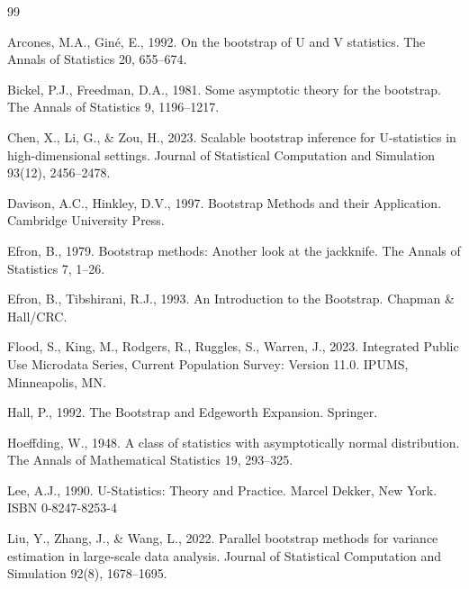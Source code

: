 \documentclass[12pt,a4paper]{article}
\begin{document}
\begin{thebibliography}{99}

Arcones, M.A., Gin{\'e}, E., 1992.
On the bootstrap of U and V statistics.
The Annals of Statistics 20, 655--674.

Bickel, P.J., Freedman, D.A., 1981.
Some asymptotic theory for the bootstrap.
The Annals of Statistics 9, 1196--1217.

Chen, X., Li, G., & Zou, H., 2023.
Scalable bootstrap inference for U-statistics in high-dimensional settings.
Journal of Statistical Computation and Simulation 93(12), 2456--2478.

Davison, A.C., Hinkley, D.V., 1997.
Bootstrap Methods and their Application.
Cambridge University Press.

Efron, B., 1979.
Bootstrap methods: Another look at the jackknife.
The Annals of Statistics 7, 1--26.

Efron, B., Tibshirani, R.J., 1993.
An Introduction to the Bootstrap.
Chapman \& Hall/CRC.

Flood, S., King, M., Rodgers, R., Ruggles, S., Warren, J., 2023.
Integrated Public Use Microdata Series, Current Population Survey: Version 11.0.
IPUMS, Minneapolis, MN.


Hall, P., 1992.
The Bootstrap and Edgeworth Expansion.
Springer.

Hoeffding, W., 1948.
A class of statistics with asymptotically normal distribution.
The Annals of Mathematical Statistics 19, 293--325.

Lee, A.J., 1990.
U-Statistics: Theory and Practice.
Marcel Dekker, New York.
ISBN 0-8247-8253-4

Liu, Y., Zhang, J., & Wang, L., 2022.
Parallel bootstrap methods for variance estimation in large-scale data analysis.
Journal of Statistical Computation and Simulation 92(8), 1678--1695.


\end{thebibliography}
\end{document}
